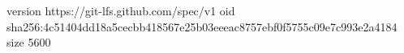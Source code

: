version https://git-lfs.github.com/spec/v1
oid sha256:4c51404dd18a5cecbb418567e25b03eeeac8757ebf0f5755c09e7c993e2a4184
size 5600
